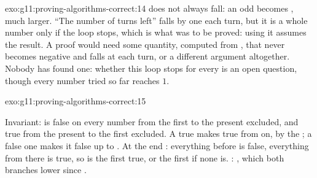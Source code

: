 \begin{solution}{exo:g11:proving-algorithms-correct:14}
 does not always fall: an odd  becomes , much larger. ``The number of turns left''
falls by one each turn, but it is a whole number only if the loop stops, which is what was to be proved: using it
assumes the result. A proof would need some quantity, computed from , that never becomes negative and falls at
each turn, or a different argument altogether. Nobody has found one: whether this loop stops for every  is an
open question, though every number tried so far reaches $1$.
\end{solution}

\begin{solution}{exo:g11:proving-algorithms-correct:15}
\smallskip\noindent\hspace*{2em}

\noindent\hspace*{4em}

\noindent\hspace*{6em}

\noindent\hspace*{6em}

\noindent\hspace*{8em}

\noindent\hspace*{6em}

\noindent\hspace*{8em}

\noindent\hspace*{4em}

\smallskip\noindent Invariant:  is false on every number from the first  to the present
 excluded, and true from the present  to the first  excluded. A true  makes
 true from  on, by the ; a false one makes it false up to . At the end
: everything before is false, everything from there is true, so  is the first true, or the
first  if none is. : , which both branches lower since .
\end{solution}

